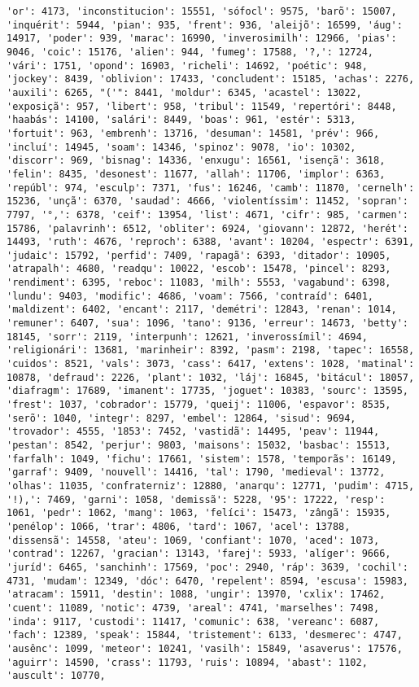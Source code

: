 \begin{Verbatim}[commandchars=\\\{\}]
'or': 4173, 'inconstitucion': 15551, 'sófocl': 9575, 'barõ': 15007, 'inquérit': 5944, 'pian': 935, 'frent': 936, 'aleijõ': 16599, 'áug': 14917, 'poder': 939, 'marac': 16990, 'inverosimilh': 12966, 'pias': 9046, 'coic': 15176, 'alien': 944, 'fumeg': 17588, '?,': 12724, 'vári': 1751, 'opond': 16903, 'richeli': 14692, 'poétic': 948, 'jockey': 8439, 'oblivion': 17433, 'concludent': 15185, 'achas': 2276, 'auxili': 6265, "('": 8441, 'moldur': 6345, 'acastel': 13022, 'exposiçã': 957, 'libert': 958, 'tribul': 11549, 'repertóri': 8448, 'haabás': 14100, 'salári': 8449, 'boas': 961, 'estér': 5313, 'fortuit': 963, 'embrenh': 13716, 'desuman': 14581, 'prév': 966, 'incluí': 14945, 'soam': 14346, 'spinoz': 9078, 'io': 10302, 'discorr': 969, 'bisnag': 14336, 'enxugu': 16561, 'isençã': 3618, 'felin': 8435, 'desonest': 11677, 'allah': 11706, 'implor': 6363, 'repúbl': 974, 'esculp': 7371, 'fus': 16246, 'camb': 11870, 'cernelh': 15236, 'unçã': 6370, 'saudad': 4666, 'violentíssim': 11452, 'sopran': 7797, '°,': 6378, 'ceif': 13954, 'list': 4671, 'cifr': 985, 'carmen': 15786, 'palavrinh': 6512, 'obliter': 6924, 'giovann': 12872, 'herét': 14493, 'ruth': 4676, 'reproch': 6388, 'avant': 10204, 'espectr': 6391, 'judaic': 15792, 'perfid': 7409, 'rapagã': 6393, 'ditador': 10905, 'atrapalh': 4680, 'readqu': 10022, 'escob': 15478, 'pincel': 8293, 'rendiment': 6395, 'reboc': 11083, 'milh': 5553, 'vagabund': 6398, 'lundu': 9403, 'modific': 4686, 'voam': 7566, 'contraíd': 6401, 'maldizent': 6402, 'encant': 2117, 'demétri': 12843, 'renan': 1014, 'remuner': 6407, 'sua': 1096, 'tano': 9136, 'erreur': 14673, 'betty': 18145, 'sorr': 2119, 'interpunh': 12621, 'inverossímil': 4694, 'religionári': 13681, 'marinheir': 8392, 'pasm': 2198, 'tapec': 16558, 'cuidos': 8521, 'vals': 3073, 'cass': 6417, 'extens': 1028, 'matinal': 10878, 'defraud': 2226, 'plant': 1032, 'láj': 16845, 'bitácul': 18057, 'diafragm': 17689, 'imanent': 17735, 'joguet': 10383, 'sourc': 13595, 'frest': 1037, 'cobrador': 15779, 'queij': 11006, 'espavor': 8535, 'serõ': 1040, 'integr': 8297, 'embel': 12864, 'sisud': 9694, 'trovador': 4555, '1853': 7452, 'vastidã': 14495, 'peav': 11944, 'pestan': 8542, 'perjur': 9803, 'maisons': 15032, 'basbac': 15513, 'farfalh': 1049, 'fichu': 17661, 'sistem': 1578, 'temporãs': 16149, 'garraf': 9409, 'nouvell': 14416, 'tal': 1790, 'medieval': 13772, 'olhas': 11035, 'confraterniz': 12880, 'anarqu': 12771, 'pudim': 4715, '!),': 7469, 'garni': 1058, 'demissã': 5228, '95': 17222, 'resp': 1061, 'pedr': 1062, 'mang': 1063, 'felíci': 15473, 'zângã': 15935, 'penélop': 1066, 'trar': 4806, 'tard': 1067, 'acel': 13788, 'dissensã': 14558, 'ateu': 1069, 'confiant': 1070, 'aced': 1073, 'contrad': 12267, 'gracian': 13143, 'farej': 5933, 'alíger': 9666, 'juríd': 6465, 'sanchinh': 17569, 'poc': 2940, 'ráp': 3639, 'cochil': 4731, 'mudam': 12349, 'dóc': 6470, 'repelent': 8594, 'escusa': 15983, 'atracam': 15911, 'destin': 1088, 'ungir': 13970, 'cxlix': 17462, 'cuent': 11089, 'notic': 4739, 'areal': 4741, 'marselhes': 7498, 'inda': 9117, 'custodi': 11417, 'comunic': 638, 'vereanc': 6087, 'fach': 12389, 'speak': 15844, 'tristement': 6133, 'desmerec': 4747, 'ausênc': 1099, 'meteor': 10241, 'vasilh': 15849, 'asaverus': 17576, 'aguirr': 14590, 'crass': 11793, 'ruis': 10894, 'abast': 1102, 'auscult': 10770, 
\end{Verbatim}
